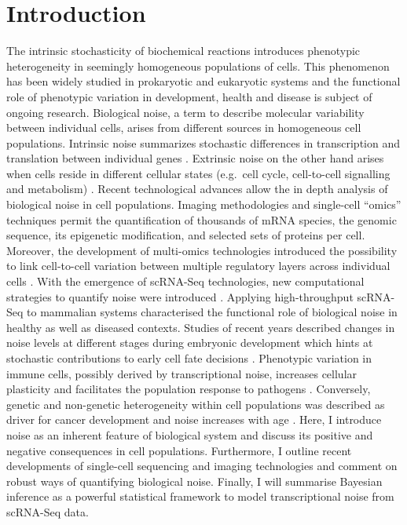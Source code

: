 
\chapter{Introduction}  

\graphicspath{{"../../Dropbox (Cambridge  University)/Figures_for_thesis/Introduction/"}}

\begin{Abstract}
The intrinsic stochasticity of biochemical reactions introduces phenotypic heterogeneity in seemingly homogeneous populations of cells. This phenomenon has been widely studied in prokaryotic and eukaryotic systems and the functional role of phenotypic variation in development, health and disease is subject of ongoing research. Biological noise, a term to describe molecular variability between individual cells, arises from different sources in homogeneous cell populations. Intrinsic noise summarizes stochastic differences in transcription and translation between individual genes \citep{Elowitz2002, Raser2004, Sanchez2013}. Extrinsic noise on the other hand arises when cells reside in different cellular states (e.g.~cell cycle, cell-to-cell signalling and metabolism)  \citep{Zopf2013, Iwamoto2016, Kiviet2014}. Recent technological advances allow the in depth analysis of biological noise in cell populations. Imaging methodologies \citep{Moffitt2016a} and single-cell “omics” techniques \citep{Bock2016} permit the quantification of thousands of mRNA species, the genomic sequence, its epigenetic modification, and selected sets of proteins per cell. Moreover, the development of multi-omics technologies introduced the possibility to link cell-to-cell variation between multiple regulatory layers across individual cells \citep{Macaulay2017}. With the emergence of \gls{scRNA-Seq} technologies, new computational strategies to quantify noise were introduced \cite{Brennecke2013, Vallejos2015, Kolodziejczyk2015cell, Buettner2015, Fan2015a, Richard2016}. Applying high-throughput scRNA-Seq to mammalian systems characterised the functional role of biological noise in healthy as well as diseased contexts. Studies of recent years described changes in noise levels at different stages during embryonic development which hints at stochastic contributions to early cell fate decisions \citep{Goolam2016, Mohammed2017, Ohnishi2014}. Phenotypic variation in immune cells, possibly derived by transcriptional noise, increases cellular plasticity and facilitates the population response to pathogens \citep{Shalek2014, Kellogg2015a}. Conversely, genetic and non-genetic heterogeneity within cell populations was described as driver for cancer development \citep{Marusyk2012} and noise increases with age \citep{Martinez-jimenez2017, Enge2017}. Here, I introduce noise as an inherent feature of biological system and discuss its positive and negative consequences in cell populations. Furthermore, I outline recent developments of single-cell sequencing and imaging technologies and comment on robust ways of quantifying biological noise. Finally, I will summarise Bayesian inference as a powerful statistical framework to model transcriptional noise from \gls{scRNA-Seq} data.

\end{Abstract}
